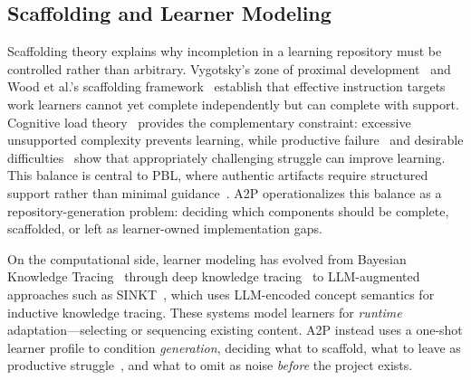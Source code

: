 \documentclass[11pt]{article}
\begin{document}
\subsection{Scaffolding and Learner Modeling}

Scaffolding theory explains why incompletion in a learning repository must be controlled rather than arbitrary.
Vygotsky's zone of proximal development~\cite{vygotsky1978} and Wood et al.'s scaffolding framework~\cite{wood1976scaffolding} establish that effective instruction targets work learners cannot yet complete independently but can complete with support.
Cognitive load theory~\cite{sweller1988cognitive} provides the complementary constraint: excessive unsupported complexity prevents learning, while productive failure~\cite{kapur2008productive} and desirable difficulties~\cite{bjork2011desirable} show that appropriately challenging struggle can improve learning.
This balance is central to PBL, where authentic artifacts require structured support rather than minimal guidance~\cite{kirschner2006minimal,hmelosilver2007scaffolding,krajcik2014pbl}.
A2P operationalizes this balance as a repository-generation problem: deciding which components should be complete, scaffolded, or left as learner-owned implementation gaps.

On the computational side, learner modeling has evolved from Bayesian Knowledge Tracing~\cite{corbett1995knowledge} through deep knowledge tracing~\cite{piech2015deep} to LLM-augmented approaches such as SINKT~\cite{gao2024sinkt}, which uses LLM-encoded concept semantics for inductive knowledge tracing.
These systems model learners for \emph{runtime} adaptation---selecting or sequencing existing content.
A2P instead uses a one-shot learner profile to condition \emph{generation}, deciding what to scaffold, what to leave as productive struggle~\cite{kapur2008productive}, and what to omit as noise \emph{before} the project exists.


\end{document}
